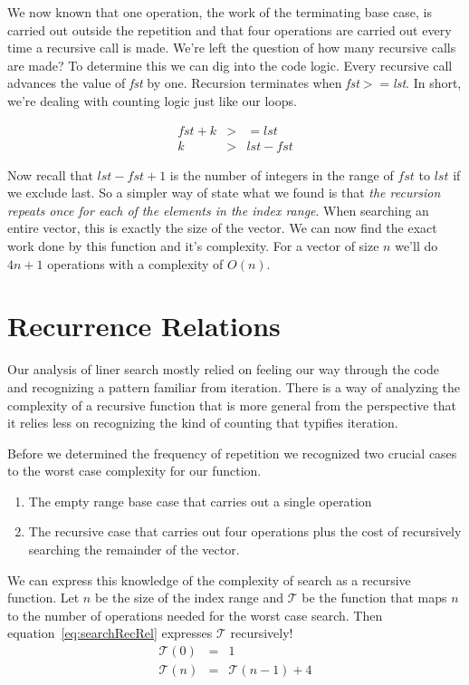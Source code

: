 \documentclass[nobib]{tufte-handout}
\begin{document}
We now known that one operation, the work of the terminating base case, is carried out outside the repetition and that four operations are carried out every time a recursive call is made. We're left the question of how many recursive calls are made? To determine this we can dig into the code logic. Every recursive call advances the value of \textit{fst} by one. Recursion terminates when \textit{fst}$>=$\textit{lst}. In short, we're dealing with counting logic just like our loops.

\begin{equation}
  \begin{array}{rcl}
  fst + k &>&= lst \\
  k &>& lst - fst
  \end{array}
\end{equation}

Now recall that $lst-fst+1$ is the number of integers in the range of $fst$ to $lst$ if we exclude last. So a simpler way of state what we found is that \textit{the recursion repeats once for each of the elements in the index range}.  When searching an entire vector, this is exactly the size of the vector. We can now find the exact work done by this function and it's complexity. For a vector of size $n$ we'll do $4n+1$ operations with a complexity of $O(n)$.

\section{Recurrence Relations}

Our analysis of liner search mostly relied on feeling our way through the code and recognizing a pattern familiar from iteration. There is a way of analyzing the complexity of a recursive function that is more general from the perspective that it relies less on recognizing the kind of counting that typifies iteration.

Before we determined the frequency of repetition we recognized two crucial cases to the worst case complexity for our function.
\begin{enumerate}
  \item The empty range base case that carries out a single operation
  \item The recursive case that carries out four operations plus the cost of recursively searching the remainder of the vector.
\end{enumerate}

We can express this knowledge of the complexity of search as a recursive function. Let $n$ be the size of the index range and $\mathcal{T}$ be the function that maps $n$ to the number of operations needed for the worst case search. Then equation~\ref{eq:searchRecRel} expresses $\mathcal{T}$ recursively!
\begin{equation}
  \begin{array}{rcl}
    \mathcal{T}(0) &=& 1 \\
    \mathcal{T}(n) &=& \mathcal{T}(n-1) + 4
  \end{array}
\label{eq:searchRecRel}
\end{equation}
\end{document}
